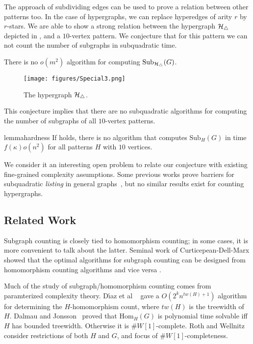 \documentclass[a4paper,UKenglish,cleveref, autoref, numberwithinsect, thm-restate]{lipics-v2021}
\newcommand{\hyperthree}{\cH_\triangle}
\newcommand{\Hom}[2]{\mathrm{Hom}_{#2}(#1)}
\newcommand{\Sub}[2]{\mathrm{Sub}_{#2}(#1)}
\newcommand{\degen}{\kappa}
\newcommand{\cH}{{\cal H}}
\begin{document}
	The approach of subdividing edges can be used to prove a relation between other patterns too. In the case of hypergraphs, we can replace hyperedges of arity $r$ by $r$-stars. We are able to show a strong relation between the hypergraph $\hyperthree$ depicted in , and a $10$-vertex pattern. We conjecture that for this pattern we can not count the number of subgraphs in subquadratic time.
	\begin{conjecture} \label{conj:hyperthree}
		There is no $o(m^2)$ algorithm for computing $\Sub{G}{\hyperthree}$.
	\end{conjecture}
	\begin{figure}
	\centering
	\texttt{[image: figures/Special3.png]}\caption{The hypergraph $\hyperthree$.}
	\label{fig:hyperthree}
	\end{figure}
	This conjecture implies that there are no subquadratic algorithms for computing the number of subgraphs of all $10$-vertex patterns.
	\begin{restatable}{lemma}{hardness} \label{lem:hardness}
		If  holds, there is no algorithm that computes $\Sub{G}{H}$ in time $f(\degen)o(n^{2})$ for all patterns $H$ with $10$ vertices.
	\end{restatable}
	We consider it an interesting open problem to relate our conjecture with existing fine-grained complexity assumptions. Some previous works prove barriers for subquadratic \emph{listing} in general graphs~\cite{BrGo24}, but no similar results exist for counting hypergraphs.

	
	\subsection{Related Work}  \label{sec:related}
	
	Subgraph counting is closely tied to homomorphism counting; in some cases,
	it is more convenient to talk about the latter. Seminal work
	of Curticepean-Dell-Marx showed that the optimal algorithms for subgraph
	counting can be designed from homomorphism counting algorithms and vice versa \cite{CuDeMa17}.
	
	Much of the study of subgraph/homomorphism counting comes from
	paramterized complexity theory.
	D{\'\i}az et al ~\cite{DiSeTh02} gave a $O(2^{k}n^{tw(H)+1})$
	algorithm for determining the $H$-homomorphism count,
	where $tw(H)$ is the treewidth of $H$.
	Dalmau and Jonsson~\cite{DaJo04} proved
	that $\Hom{G}{H}$ is polynomial time solvable iff
	$H$ has bounded treewidth. Otherwise it is
	$\#W[1]$-complete. Roth and Wellnitz~\cite{RoWe20} consider 
	restrictions of both $H$ and $G$, and focus of $\#W[1]$-completeness.
	
\end{document}
